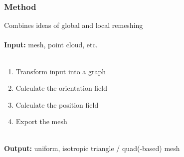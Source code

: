 \documentclass[aspectratio=43,sanserif,professionalfonts]{beamer}
\begin{document}

\begin{frame}
	\frametitle{Method}
	Combines ideas of global and local remeshing\\
	\pause
	~\\
	\textbf{Input:} mesh, point cloud, etc.\\
	~\\
	\pause
	\begin{enumerate}
		\item	Transform input into a graph
		\item	Calculate the orientation field
		\item	Calculate the position field
		\item	Export the mesh
	\end{enumerate}
	~\\
	\pause
	\textbf{Output:} uniform, isotropic triangle / quad(-based) mesh
\end{frame}
\end{document}
